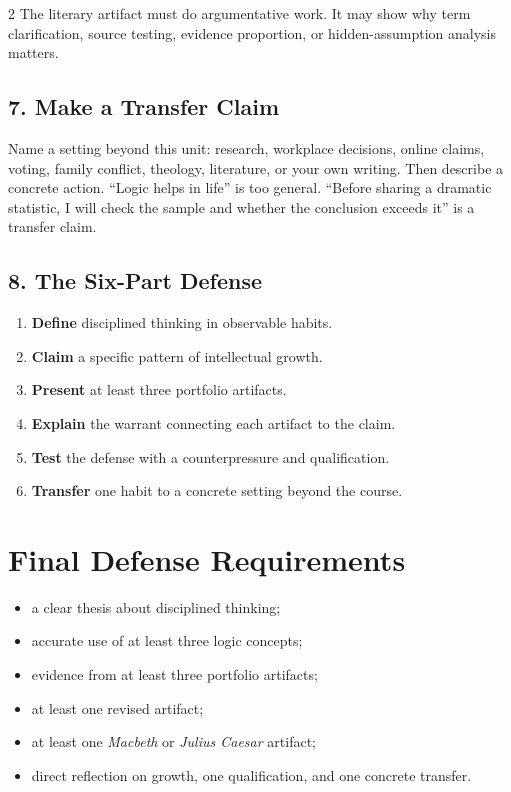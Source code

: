 \documentclass[12pt]{article}
\begin{document}
\begin{multicols}{2}
The literary artifact must do argumentative work. It may show why term clarification, source testing, evidence proportion, or hidden-assumption analysis matters.

\subsection*{7. Make a Transfer Claim}
Name a setting beyond this unit: research, workplace decisions, online claims, voting, family conflict, theology, literature, or your own writing. Then describe a concrete action. ``Logic helps in life'' is too general. ``Before sharing a dramatic statistic, I will check the sample and whether the conclusion exceeds it'' is a transfer claim.

\subsection*{8. The Six-Part Defense}
\begin{enumerate}[leftmargin=*,itemsep=0.12em]
\item \textbf{Define} disciplined thinking in observable habits.
\item \textbf{Claim} a specific pattern of intellectual growth.
\item \textbf{Present} at least three portfolio artifacts.
\item \textbf{Explain} the warrant connecting each artifact to the claim.
\item \textbf{Test} the defense with a counterpressure and qualification.
\item \textbf{Transfer} one habit to a concrete setting beyond the course.
\end{enumerate}

\section*{Final Defense Requirements}
\begin{itemize}[leftmargin=*]
\item a clear thesis about disciplined thinking;
\item accurate use of at least three logic concepts;
\item evidence from at least three portfolio artifacts;
\item at least one revised artifact;
\item at least one \textit{Macbeth} or \textit{Julius Caesar} artifact;
\item direct reflection on growth, one qualification, and one concrete transfer.
\end{itemize}


\end{multicols}
\end{document}
